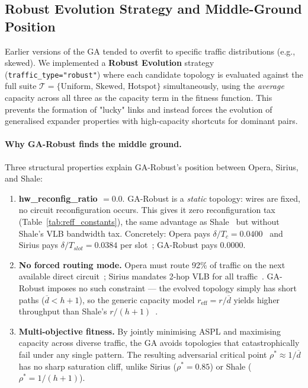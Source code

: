 \documentclass{article}
\begin{document}
    \subsection{Robust Evolution Strategy and Middle-Ground Position}
    Earlier versions of the GA tended to overfit to specific traffic distributions (e.g., skewed). We implemented a \textbf{Robust Evolution} strategy (\texttt{traffic\_type="robust"}) where each candidate topology is evaluated against the full suite $\mathcal{T} = \{\text{Uniform, Skewed, Hotspot}\}$ simultaneously, using the \emph{average} capacity across all three as the capacity term in the fitness function. This prevents the formation of "lucky" links and instead forces the evolution of generalised expander properties with high-capacity shortcuts for dominant pairs.

    \paragraph{Why GA-Robust finds the middle ground.}
    Three structural properties explain GA-Robust's position between Opera, Sirius, and Shale:
    \begin{enumerate}
        \item \textbf{hw\_reconfig\_ratio $= 0.0$}.  GA-Robust is a \emph{static} topology: wires are fixed, no circuit reconfiguration occurs.  This gives it zero reconfiguration tax (Table~\ref{tab:reff_constants}), the same advantage as Shale~\cite{shale} but without Shale's VLB bandwidth tax.  Concretely: Opera pays $\delta/T_c = 0.0400$~\cite{opera} and Sirius pays $\delta/T_{slot} = 0.0384$ per slot~\cite{sirius}; GA-Robust pays $0.0000$.
        \item \textbf{No forced routing mode.}  Opera must route 92\% of traffic on the next available direct circuit~\cite{opera}; Sirius mandates 2-hop VLB for all traffic~\cite{sirius}.  GA-Robust imposes no such constraint --- the evolved topology simply has short paths ($\overline{d} < h{+}1$), so the generic capacity model $r_{\text{eff}} = r/\overline{d}$ yields higher throughput than Shale's $r/(h{+}1)$~\cite{shale}.
        \item \textbf{Multi-objective fitness.}  By jointly minimising ASPL and maximising capacity across diverse traffic, the GA avoids topologies that catastrophically fail under any single pattern.  The resulting adversarial critical point $\rho^* \approx 1/\overline{d}$ has no sharp saturation cliff, unlike Sirius ($\rho^*=0.85$) or Shale ($\rho^*=1/(h{+}1)$).
    \end{enumerate}
\end{document}

